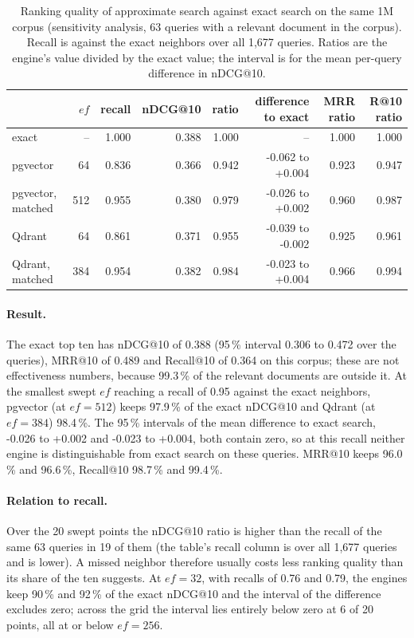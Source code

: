 \documentclass[preprint,12pt]{elsarticle}
\begin{document}
\begin{table}[t]
  \caption{Ranking quality of approximate search against exact search on the same 1M corpus (sensitivity analysis,
  63 queries with a relevant document in the corpus). Recall is against the exact neighbors over all 1{,}677 queries.
  Ratios are the engine's value divided by the exact value; the interval is for the mean per-query difference in nDCG@10.}
  \label{tab:ranking}
  \small
  \begin{tabular}{@{}lrrrrrrr@{}}
    \toprule
    & $ef$ & recall & nDCG@10 & ratio & difference to exact & MRR ratio & R@10 ratio \\
    \midrule
    exact & -- & 1.000 & 0.388 & 1.000 & -- & 1.000 & 1.000 \\
    pgvector & 64 & 0.836 & 0.366 & 0.942 & -0.062 to +0.004 & 0.923 & 0.947 \\
    pgvector, matched & 512 & 0.955 & 0.380 & 0.979 & -0.026 to +0.002 & 0.960 & 0.987 \\
    Qdrant & 64 & 0.861 & 0.371 & 0.955 & -0.039 to -0.002 & 0.925 & 0.961 \\
    Qdrant, matched & 384 & 0.954 & 0.382 & 0.984 & -0.023 to +0.004 & 0.966 & 0.994 \\
    \bottomrule
  \end{tabular}
\end{table}

\paragraph{Result.} The exact top ten has nDCG@10 of 0.388 (95\,\% interval 0.306 to 0.472 over the queries), MRR@10 of 0.489 and
Recall@10 of 0.364 on this corpus; these are not effectiveness numbers, because 99.3\,\% of the relevant documents are
outside it.
At the smallest swept $ef$ reaching a recall of 0.95 against the exact neighbors, pgvector (at $ef=512$) keeps 97.9\,\% of
the exact nDCG@10 and Qdrant (at $ef=384$) 98.4\,\%. The 95\,\% intervals of the mean difference to exact search, -0.026 to +0.002 and -0.023 to +0.004, both contain
zero, so at this recall neither engine is distinguishable from exact search on these queries. MRR@10 keeps 96.0\,\% and
96.6\,\%, Recall@10 98.7\,\% and 99.4\,\%.

\paragraph{Relation to recall.} Over the 20 swept points the nDCG@10 ratio is higher than the recall of the same 63 queries in 19 of them (the
table's recall column is over all 1{,}677 queries and is lower). A missed neighbor therefore usually costs less ranking
quality than its share of the ten suggests. At $ef=32$, with recalls of 0.76 and 0.79, the engines keep 90\,\% and 92\,\% of the exact nDCG@10 and the interval of the
difference excludes zero; across the grid the interval lies entirely below zero at 6 of 20 points, all at or below $ef=256$.
\end{document}
